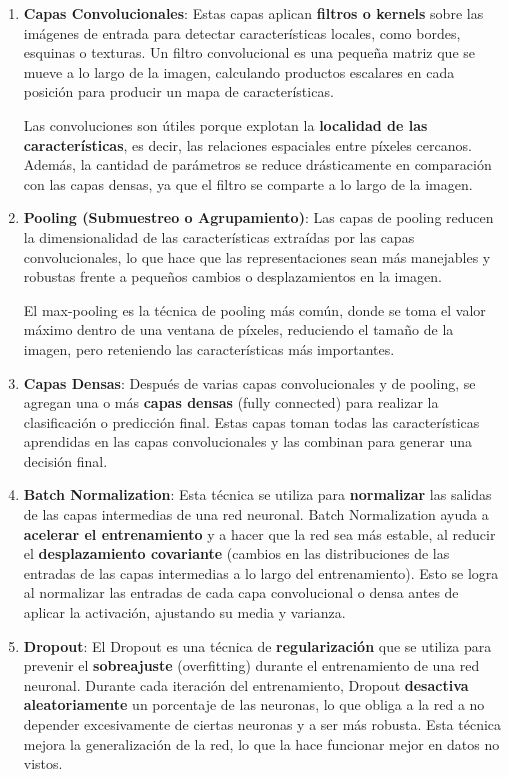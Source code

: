\begin{enumerate}
    \item \textbf{Capas Convolucionales}: Estas capas aplican \textbf{filtros o kernels} sobre las imágenes de entrada
          para detectar características locales, como bordes, esquinas o texturas.
          Un filtro convolucional es una pequeña matriz que se mueve a lo largo de la imagen, calculando productos escalares en
          cada posición para producir un mapa de características.

          Las convoluciones son útiles porque explotan la \textbf{localidad de las características}, es decir, las relaciones
          espaciales entre píxeles cercanos.
          Además, la cantidad de parámetros se reduce drásticamente en comparación con las capas densas, ya que el filtro se
          comparte a lo largo de la imagen.
    \item \textbf{Pooling (Submuestreo o Agrupamiento)}: Las capas de pooling reducen la dimensionalidad de las
          características extraídas por las capas convolucionales, lo que hace que las representaciones sean más manejables y
          robustas frente a pequeños cambios o desplazamientos en la imagen.

          El max-pooling es la técnica de pooling más común, donde se toma el valor máximo dentro de una ventana de píxeles,
          reduciendo el tamaño de la imagen, pero reteniendo las características más importantes.
    \item \textbf{Capas Densas}: Después de varias capas convolucionales y de pooling, se agregan una o más
          \textbf{capas densas} (fully connected) para realizar la clasificación o predicción final.
          Estas capas toman todas las características aprendidas en las capas convolucionales y las combinan para generar una
          decisión final.
    \item \textbf{Batch Normalization}: Esta técnica se utiliza para \textbf{normalizar} las salidas de las capas
          intermedias de una red neuronal.
          Batch Normalization ayuda a \textbf{acelerar el entrenamiento} y a hacer que la red sea más estable, al reducir el
          \textbf{desplazamiento covariante} (cambios en las distribuciones de las entradas de las capas intermedias a lo largo
          del entrenamiento).
          Esto se logra al normalizar las entradas de cada capa convolucional o densa antes de aplicar la activación, ajustando
          su media y varianza.

    \item \textbf{Dropout}: El Dropout es una técnica de \textbf{regularización} que se utiliza para prevenir el
          \textbf{sobreajuste} (overfitting) durante el entrenamiento de una red neuronal.
          Durante cada iteración del entrenamiento, Dropout \textbf{desactiva aleatoriamente} un porcentaje de las neuronas, lo
          que obliga a la red a no depender excesivamente de ciertas neuronas y a ser más robusta.
          Esta técnica mejora la generalización de la red, lo que la hace funcionar mejor en datos no vistos.

\end{enumerate}


